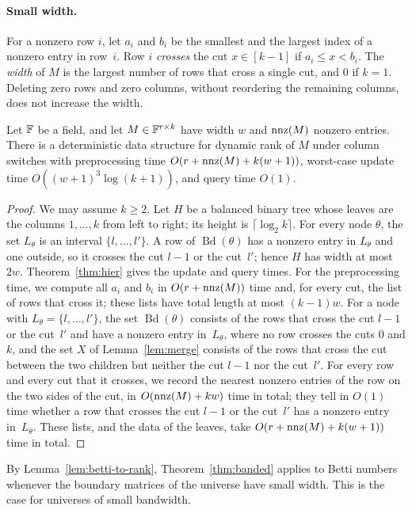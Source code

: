 \paragraph{Small width.}
For a nonzero row $i$, let $a_i$ and $b_i$ be the smallest and the largest index of a nonzero entry in row~$i$.
Row $i$ \emph{crosses} the cut $x\in[k-1]$ if $a_i\le x<b_i$.
The \emph{width} of $M$ is the largest number of rows that cross a single cut, and $0$ if $k=1$.
Deleting zero rows and zero columns, without reordering the remaining columns, does not increase the width.

\begin{theorem}\label{thm:banded}
Let $\mathbb{F}$ be a field, and let $M\in\mathbb{F}^{r\times k}$ have width $w$ and $\operatorname{nnz}(M)$ nonzero entries.
There is a deterministic data structure for dynamic rank of $M$ under column switches with preprocessing time $O(r+\operatorname{nnz}(M)+k(w+1))$, worst-case update time $O((w+1)^3\log(k+1))$, and query time $O(1)$.
\end{theorem}

\begin{proof}
We may assume $k\ge2$.
Let $H$ be a balanced binary tree whose leaves are the columns $1,\dots,k$ from left to right; its height is $\lceil\log_2k\rceil$.
For every node $\theta$, the set $L_\theta$ is an interval $\{l,\dots,l'\}$.
A row of $\operatorname{Bd}(\theta)$ has a nonzero entry in $L_\theta$ and one outside, so it crosses the cut $l-1$ or the cut~$l'$; hence $H$ has width at most~$2w$.
Theorem~\ref{thm:hier} gives the update and query times.
For the preprocessing time, we compute all $a_i$ and $b_i$ in $O(r+\operatorname{nnz}(M))$ time and, for every cut, the list of rows that cross it; these lists have total length at most $(k-1)w$.
For a node with $L_\theta=\{l,\dots,l'\}$, the set $\operatorname{Bd}(\theta)$ consists of the rows that cross the cut $l-1$ or the cut~$l'$ and have a nonzero entry in~$L_\theta$, where no row crosses the cuts $0$ and $k$, and the set $X$ of Lemma~\ref{lem:merge} consists of the rows that cross the cut between the two children but neither the cut $l-1$ nor the cut~$l'$.
For every row and every cut that it crosses, we record the nearest nonzero entries of the row on the two sides of the cut, in $O(\operatorname{nnz}(M)+kw)$ time in total; they tell in $O(1)$ time whether a row that crosses the cut $l-1$ or the cut~$l'$ has a nonzero entry in~$L_\theta$.
These lists, and the data of the leaves, take $O(r+\operatorname{nnz}(M)+k(w+1))$ time in total.
\end{proof}

By Lemma~\ref{lem:betti-to-rank}, Theorem~\ref{thm:banded} applies to Betti numbers whenever the boundary matrices of the universe have small width.
This is the case for universes of small bandwidth.

